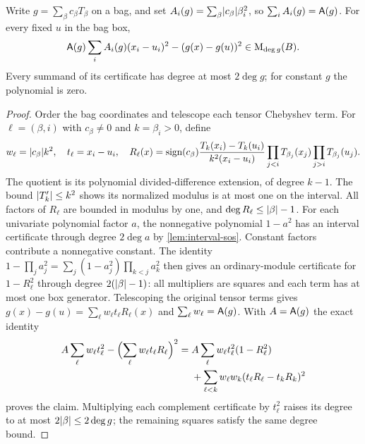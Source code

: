 \begin{lemma}\label{lem:ext-difference}
Write $g=\sum_\beta c_\beta T_\beta$ on a bag, and set
$A_i(g)=\sum_\beta\lvert c_\beta\rvert\beta_i^2$, so
$\sum_i A_i(g)=\mathsf{A}(g)$. For every fixed $u$ in the bag box,
\begin{equation}\label{eq:ext-difference}
 \mathsf{A}(g)\sum_i A_i(g)(x_i-u_i)^2-(g(x)-g(u))^2
 \in\mathrm{M}_{\deg g}(B).
\end{equation}
Every summand of its certificate has degree at most $2\deg g$; for
constant $g$ the polynomial is zero.
\end{lemma}
\begin{proof}
Order the bag coordinates and telescope each tensor Chebyshev term. For
$\ell=(\beta,i)$ with $c_\beta\ne0$ and $k=\beta_i>0$, define
\[
 w_\ell=\lvert c_\beta\rvert k^2,\quad t_\ell=x_i-u_i,\quad
 R_\ell(x)=\operatorname{sign}(c_\beta)
 \frac{T_k(x_i)-T_k(u_i)}{k^2(x_i-u_i)}
 \prod_{j<i}T_{\beta_j}(x_j)\prod_{j>i}T_{\beta_j}(u_j).
\]
The quotient is its polynomial divided-difference extension, of degree
$k-1$. The bound $\lvert T_k'\rvert\le k^2$ shows its normalized modulus is at
most one on the interval. All factors of $R_\ell$ are bounded in modulus
by one, and $\deg R_\ell\le\lvert \beta\rvert-1$.
For each univariate polynomial factor $a$, the nonnegative polynomial
$1-a^2$ has an interval certificate through degree $2\deg a$ by
\cref{lem:interval-sos}. Constant factors contribute a nonnegative
constant. The identity
$1-\prod_j a_j^2=\sum_j(1-a_j^2)\prod_{k<j}a_k^2$
then gives an ordinary-module certificate for $1-R_\ell^2$ through degree
$2(\lvert \beta\rvert-1)$: all multipliers are squares and each term has at most
one box generator. Telescoping the original tensor terms gives
$g(x)-g(u)=\sum_\ell w_\ell t_\ell R_\ell(x)$ and
$\sum_\ell w_\ell=\mathsf{A}(g)$. With $A=\mathsf{A}(g)$ the exact identity
\begin{align*}
 A\sum_\ell w_\ell t_\ell^2-
       \Bigl(\sum_\ell w_\ell t_\ell R_\ell\Bigr)^2
 ={}&A\sum_\ell w_\ell t_\ell^2(1-R_\ell^2)\\
 &+\sum_{\ell<k}w_\ell w_k
        (t_\ell R_\ell-t_kR_k)^2
\end{align*}
proves the claim. Multiplying each complement certificate by $t_\ell^2$
raises its degree to at most $2\lvert \beta\rvert\le2\deg g$; the remaining
squares satisfy the same degree bound.
\end{proof}

